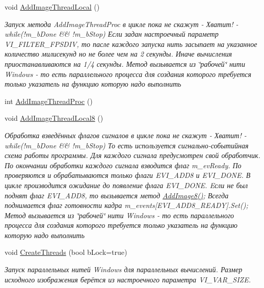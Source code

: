 \begin{DoxyCompactItemize}
\item 
void \hyperlink{class_c_v_i_engine_base_a6ca94a8d39e8a76e5be4698cc2eff06b}{Add\+Image\+Thread\+Local} ()
\begin{DoxyCompactList}\small\item\em Запуск метода Add\+Image\+Thread\+Proc в цикле пока не скажут -\/ Хватит! -\/ while(!m\+\_\+b\+Done \&\& !m\+\_\+b\+Stop) Если задан настроечный параметр V\+I\+\_\+\+F\+I\+L\+T\+E\+R\+\_\+\+F\+P\+S\+D\+I\+V, то пасле каждого запуска нить засыпает на указанное количество милисекунд но не более чем на 2 секунды. Иначе вычисления приостанавливаются на 1/4 секунды. Метод вызывается из \char`\"{}рабочей\char`\"{} нити Windows -\/ то есть параллельного процесса для создания которого требуется только указатель на функцию которую надо выполнить \end{DoxyCompactList}\item 
int \hyperlink{class_c_v_i_engine_base_ac9fbe14762f4d2bf7d0bffe451a329ee}{Add\+Image\+Thread\+Proc} ()
\item 
void \hyperlink{class_c_v_i_engine_base_a180f4a67ef6b4137c8b8565310aa7834}{Add\+Image\+Thread\+Local8} ()
\begin{DoxyCompactList}\small\item\em Обработка взведённых флагов сигналов в цикле пока не скажут -\/ Хватит! -\/ while(!m\+\_\+b\+Done \&\& !m\+\_\+b\+Stop) То есть используется сигнально-\/событийная схема работы программы. Для каждого сигнала предусмотрен свой обработчик. По окончании обработки каждого сигнала взводится флаг m\+\_\+ev\+Ready. По проверяются и обрабатываются только флаги E\+V\+I\+\_\+\+A\+D\+D8 и E\+V\+I\+\_\+\+D\+O\+N\+E. В цикле производится ожидание до появление флага E\+V\+I\+\_\+\+D\+O\+N\+E. Eсли не был поднят флаг E\+V\+I\+\_\+\+A\+D\+D8, то вызывается метод \hyperlink{class_c_v_i_engine_base_a3fe6ae4f9ac6b9422c22d99878f424f5}{Add\+Image8()}; Всегда поднимается флаг готовности кадра m\+\_\+events\mbox{[}E\+V\+I\+\_\+\+A\+D\+D8\+\_\+\+R\+E\+A\+D\+Y\mbox{]}.Set(); Метод вызывается из \char`\"{}рабочей\char`\"{} нити Windows -\/ то есть параллельного процесса для создания которого требуется только указатель на функцию которую надо выполнить \end{DoxyCompactList}\item 
void \hyperlink{class_c_v_i_engine_base_a053908c9c2c18583a13e6f6f79c8eeab}{Create\+Threads} (bool b\+Lock=true)
\begin{DoxyCompactList}\small\item\em Запуск параллельных нитей Windows для параллельных вычислений. Размер исходного изображения берётся из настроечного параметра V\+I\+\_\+\+V\+A\+R\+\_\+\+S\+I\+Z\+E. \end{DoxyCompactList}\item 

\end{DoxyCompactItemize}
